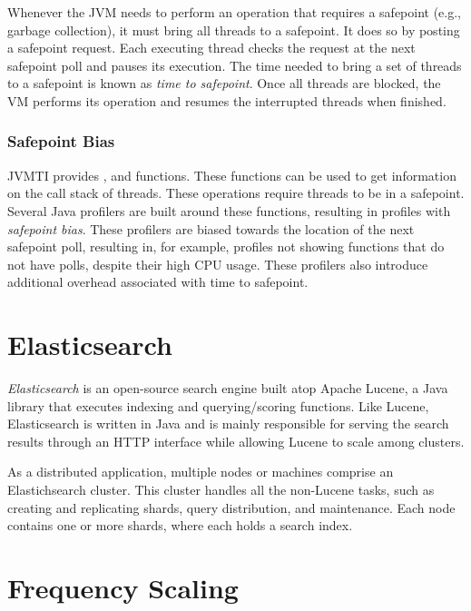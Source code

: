 Whenever the JVM needs to perform an operation that requires a safepoint (e.g., garbage collection), it must bring all threads to a safepoint. It does so by posting a safepoint request. Each executing thread checks the request at the next safepoint poll and pauses its execution. The time needed to bring a set of threads to a safepoint is known as \emph{time to safepoint}. Once all threads are blocked, the VM performs its operation and resumes the interrupted threads when finished.

\subsubsection*{Safepoint Bias}

JVMTI provides ,  and  functions. These functions can be used to get information on the call stack of threads. These operations require threads to be in a safepoint. Several Java profilers are built around these functions, resulting in profiles with \emph{safepoint bias}. These profilers are biased towards the location of the next safepoint poll, resulting in, for example, profiles not showing functions that do not have polls, despite their high CPU usage. These profilers also introduce additional overhead associated with time to safepoint.




\section{Elasticsearch}

\emph{Elasticsearch} is an open-source search engine built atop Apache Lucene, a Java library that executes indexing and querying/scoring functions. Like Lucene, Elasticsearch is written in Java and is mainly responsible for serving the search results through an HTTP interface while allowing Lucene to scale among clusters.

As a distributed application, multiple nodes or machines comprise an Elastichsearch cluster. This cluster handles all the non-Lucene tasks, such as creating and replicating shards, query distribution, and maintenance. Each node contains one or more shards, where each holds a search index.

\section{Frequency Scaling}

